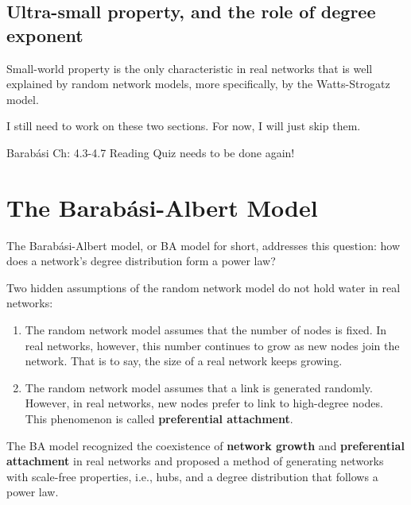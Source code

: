 \documentclass[
]{krantz}
\makeatletter
\newenvironment{kframe}{%
\medskip{}
\setlength{\fboxsep}{.8em}
 \def\at@end@of@kframe{}%
 \ifinner\ifhmode%
  \def\at@end@of@kframe{\end{minipage}}%
  \begin{minipage}{\columnwidth}%
 \fi\fi%
 \def\FrameCommand##1{\hskip\@totalleftmargin \hskip-\fboxsep
 \colorbox{shadecolor}{##1}\hskip-\fboxsep
     \hskip-\linewidth \hskip-\@totalleftmargin \hskip\columnwidth}%
 \MakeFramed {\advance\hsize-\width
   \@totalleftmargin\z@ \linewidth\hsize
   \@setminipage}}%
 {\par\unskip\endMakeFramed%
 \at@end@of@kframe}
\newenvironment{rmdblock}[1]
  {
  \begin{itemize}
  \renewcommand{\labelitemi}{
    \raisebox{-.7\height}[0pt][0pt]{
      {\setkeys{Gin}{width=3em,keepaspectratio}\texttt{[image: images/\#1]}}
    }
  }
  \setlength{\fboxsep}{1em}
  \begin{kframe}
  \item
  }
  {
  \end{kframe}
  \end{itemize}
  }
\newenvironment{rmdreminder}
  {\begin{rmdblock}{reminder}}
  {\end{rmdblock}}
\makeatother
\begin{document}
\hypertarget{ultra-small-property-and-the-role-of-degree-exponent}{%
\subsection{Ultra-small property, and the role of degree exponent}\label{ultra-small-property-and-the-role-of-degree-exponent}}

Small-world property is the only characteristic in real networks that is well explained by random network models, more specifically, by the Watts-Strogatz model.

\begin{rmdreminder}
I still need to work on these two sections. For now, I will just skip them.
\end{rmdreminder}

\begin{rmdreminder}
Barabási Ch: 4.3-4.7 Reading Quiz needs to be done again!
\end{rmdreminder}

\hypertarget{the-barabuxe1si-albert-model}{%
\section{The Barabási-Albert Model}\label{the-barabuxe1si-albert-model}}

The Barabási-Albert model, or BA model for short, addresses this question: how does a network's degree distribution form a power law?

Two hidden assumptions of the random network model do not hold water in real networks:

\begin{enumerate}
\def\labelenumi{\arabic{enumi}.}
\item
  The random network model assumes that the number of nodes is fixed. In real networks, however, this number continues to grow as new nodes join the network. That is to say, the size of a real network keeps growing.
\item
  The random network model assumes that a link is generated randomly. However, in real networks, new nodes prefer to link to high-degree nodes. This phenomenon is called \textbf{preferential attachment}.
\end{enumerate}

The BA model recognized the coexistence of \textbf{network growth} and \textbf{preferential attachment} in real networks and proposed a method of generating networks with scale-free properties, i.e., hubs, and a degree distribution that follows a power law.
\end{document}
